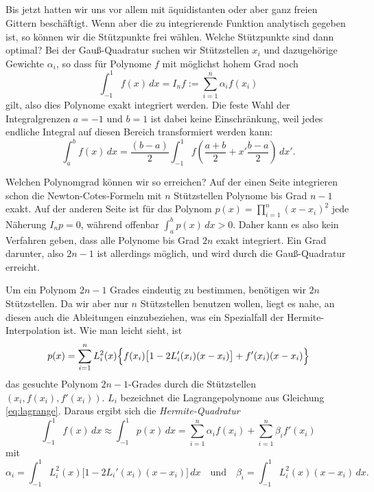 \subsection{}

Bis jetzt hatten wir uns vor allem mit äquidistanten oder aber ganz
freien Gittern beschäftigt. Wenn aber die zu integrierende Funktion
analytisch gegeben ist, so können wir die Stützpunkte frei
wählen. Welche Stützpunkte sind dann optimal? Bei der Gauß-Quadratur
suchen wir Stützstellen $x_i$ und dazugehörige Gewichte $\alpha_i$, so
dass für Polynome $f$ mit möglichst hohem Grad noch
\begin{equation}
  \int_{-1}^1 f(x)\, dx = I_n f := \sum_{i=1}^n \alpha_i f(x_i)
\end{equation}
gilt, also dies Polynome exakt integriert werden. Die feste Wahl der
Integralgrenzen $a=-1$ und $b=1$ ist dabei keine Einschränkung, weil
jedes endliche Integral auf diesen Bereich transformiert werden kann:
\begin{equation}
  \int_a^b f(x)\, dx = \frac{(b-a)}{2} \int_{-1}^{1}f\left(
  \frac{a+b}{2} + x'\frac{b-a}{2}\right
)\, dx'.
\end{equation}

Welchen Polynomgrad können wir so erreichen?  Auf der einen Seite
integrieren schon die Newton-Cotes-Formeln mit $n$ Stützstellen
Polynome bis Grad $n-1$ exakt. Auf der anderen Seite ist für das
Polynom $p(x) = \prod_{i=1}^n (x-x_i)^2$ jede Näherung $I_n p = 0$,
während offenbar $\int_{a}^{b} p(x)\,dx>0$. Daher kann es also kein
Verfahren geben, dass alle Polynome bis Grad $2n$ exakt
integriert. Ein Grad darunter, also $2n-1$ ist allerdings möglich, und
wird durch die Gauß-Quadratur erreicht.

Um ein Polynom $2n-1$ Grades eindeutig zu bestimmen, benötigen wir
$2n$ Stützstellen. Da wir aber nur $n$ Stützstellen benutzen wollen,
liegt es nahe, an diesen auch die Ableitungen einzubeziehen, was ein
Spezialfall der Hermite-Interpolation ist. Wie man leicht sieht, ist
\begin{equation}
  p(x) = \sum_{i=1}^n L_i^2(x)\Bigl\{f(x_i)\bigl[1-2L_i'(x_i)(x-x_i)\bigr] +
    f'(x_i)(x-x_i)\Bigr\}
\end{equation}
das gesuchte Polynom $2n-1$-Grades durch die Stützstellen $(x_i,
f(x_i), f'(x_i))$. $L_i$ bezeichnet die Lagrangepolynome aus Gleichung
\eqref{eq:lagrange}. Daraus ergibt sich die \emph{Hermite-Quadratur}
\begin{equation}
  \int_{-1}^1 f(x)\, dx \approx \int_{-1}^1 p(x)\, dx =
  \sum_{i=1}^{n} \alpha_i f(x_i) + \sum_{i=1}^{n} \beta_i f'(x_i)
\end{equation}
mit
\begin{equation}
  \alpha_i = \int_{-1}^1 L_i^2(x)\bigl[1-2L_i'(x_i)(x-x_i)\bigr]\,dx
  \quad\text{und}\quad
  \beta_i = \int_{-1}^1 L_i^2(x)(x-x_i)\, dx.
\end{equation}

